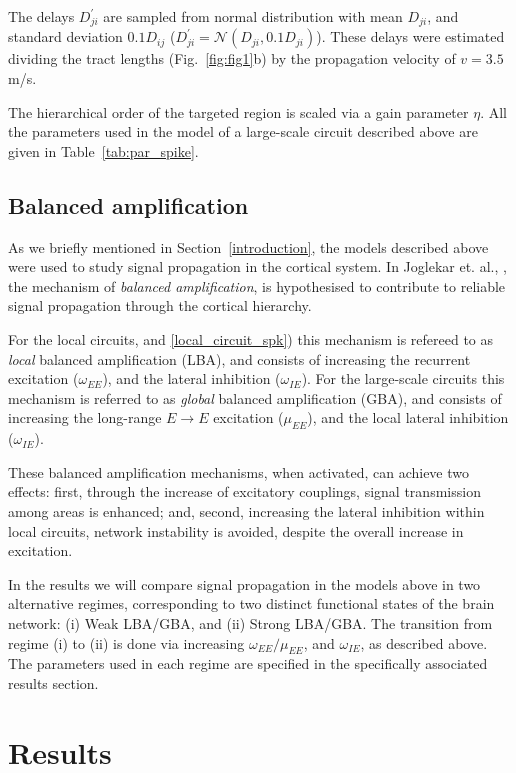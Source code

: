 \noindent  The delays $D^{'}_{ji}$ are sampled from normal distribution with mean $D_{ji}$, and standard deviation $0.1D_{ij}$ ($D^{'}_{ji} = \mathcal{N}(D_{ji}, 0.1D_{ji})$). These delays were estimated dividing the tract lengths (Fig.~\ref{fig:fig1}b) by the propagation velocity of $v=3.5$ m/s. 

The hierarchical order of the targeted region is scaled via a gain parameter $\eta$. All the parameters used in the model of a large-scale circuit described above are given in Table~\ref{tab:par_spike}.

\subsection{Balanced amplification}\label{gba}

As we briefly mentioned in Section~\ref{introduction}, the models described above were used to study signal propagation in the cortical system. In Joglekar et. al., \cite{joglekar2018inter}, the mechanism of \emph{balanced amplification}, is hypothesised to contribute to reliable signal propagation through the cortical hierarchy.

For the local circuits, and \ref{local_circuit_spk}) this mechanism is refereed to as \emph{local} balanced amplification (LBA), and consists of increasing the recurrent excitation ($\omega_{EE}$), and the lateral inhibition ($\omega_{IE}$). For the large-scale circuits this mechanism is referred to as \emph{global} balanced amplification (GBA), and consists of increasing the long-range $E\rightarrow E$ excitation  ($\mu_{EE}$), and the local lateral inhibition ($\omega_{IE}$).

These balanced amplification mechanisms, when activated, can achieve two effects: first, through the increase of excitatory couplings, signal transmission among areas is enhanced; and, second, increasing the lateral inhibition within local circuits, network instability is avoided, despite the overall increase in excitation.

In the results we will compare signal propagation in the models above in two alternative regimes, corresponding to two distinct functional states of the brain network: (i) Weak LBA/GBA, and (ii) Strong LBA/GBA. The transition from regime (i) to (ii) is done via increasing $\omega_{EE}/\mu_{EE}$, and $\omega_{IE}$, as described above. The parameters used in each regime are specified in the specifically associated results section.


\section{Results}


